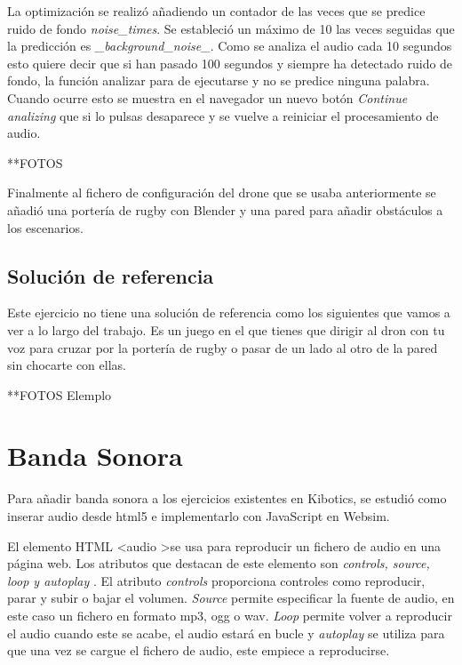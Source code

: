 La optimización se realizó añadiendo un contador de las veces que se predice ruido de fondo \textit{noise\_times}. Se estableció un máximo de 10 las veces seguidas que la predicción es \textit{\_background\_noise\_}. Como se analiza el audio cada 10 segundos esto quiere decir que si han pasado 100 segundos y siempre ha detectado ruido de fondo, la función analizar para de ejecutarse y no se predice ninguna palabra. Cuando ocurre esto se muestra en el navegador un nuevo botón \textit{Continue analizing} que  si lo pulsas desaparece y se vuelve a reiniciar el procesamiento de audio.

**FOTOS

Finalmente al fichero de configuración del drone que se usaba anteriormente se añadió una portería de rugby con Blender y una pared para añadir obstáculos a los escenarios.

\subsection{Solución de referencia}
Este ejercicio no tiene una solución de referencia como los siguientes que vamos a ver a lo largo del trabajo. Es un juego en el que tienes que dirigir al dron con tu voz para cruzar por la portería de rugby o pasar de un lado al otro de la pared sin chocarte con ellas.

**FOTOS Elemplo


\section{Banda Sonora}

Para añadir banda sonora a los ejercicios existentes en Kibotics, se estudió como inserar audio desde html5 e implementarlo con JavaScript en Websim.

El elemento HTML \textless audio \textgreater  se usa para reproducir un fichero de audio en una página web.
Los atributos que destacan de este elemento son \textit{controls, source, loop y autoplay }.
El atributo \textit{controls} proporciona controles como reproducir, parar y subir o bajar el volumen.
 \textit{Source} permite especificar la fuente de audio, en este caso un fichero en formato mp3, ogg o wav. \textit{Loop} permite volver a reproducir el audio cuando este se acabe, el audio estará en bucle y \textit{autoplay} se utiliza para que una vez se cargue el fichero de audio, este empiece a reproducirse.

